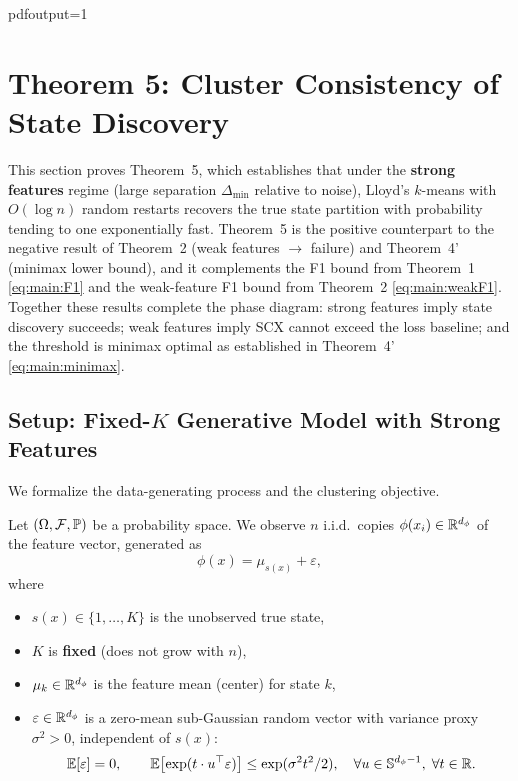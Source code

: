pdfoutput=1
\section{Theorem 5: Cluster Consistency of State Discovery}
\label{sec:S5}

This section proves Theorem~5, which establishes that under the
\textbf{strong features} regime (large separation $\Delta_{\min}$ relative
to noise), Lloyd's $k$-means with $O(\log n)$ random restarts recovers
the true state partition with probability tending to one exponentially fast.
Theorem~5 is the positive counterpart to the negative result of Theorem~2
(weak features $\to$ failure) and Theorem~4' (minimax lower bound), and
it complements the F1 bound from Theorem~1 \eqref{eq:main:F1} and the
weak-feature F1 bound from Theorem~2 \eqref{eq:main:weakF1}.
Together these results complete the phase diagram: strong features imply
state discovery succeeds; weak features imply SCX cannot exceed the loss
baseline; and the threshold is minimax optimal as established in
Theorem~4' \eqref{eq:main:minimax}.

\subsection{Setup: Fixed-$K$ Generative Model with Strong Features}
\label{sec:S5:setup}

We formalize the data-generating process and the clustering objective.

\begin{assumption}
\label{ass:S5:gen}
Let $(\Omega,\mathcal{F},\mathbb{P})$ be a probability space. We observe $n$ i.i.d.\ copies
$\phi(x_i)\in\mathbb{R}^{d_\phi}$ of the feature vector, generated as
\begin{equation}
\phi(x) = \mu_{s(x)} + \varepsilon,
\label{eq:S5:gen}
\end{equation}
where
\begin{itemize}
\item $s(x)\in\{1,\dots,K\}$ is the unobserved true state,
\item $K$ is \textbf{fixed} (does not grow with $n$),
\item $\mu_k\in\mathbb{R}^{d_\phi}$ is the feature mean (center) for state $k$,
\item $\varepsilon\in\mathbb{R}^{d_\phi}$ is a zero-mean sub-Gaussian random vector
      with variance proxy $\sigma^2>0$, independent of $s(x)$:
      \[
      \mathbb{E}[\varepsilon]=0,\qquad
      \mathbb{E}\bigl[\exp(t\cdot u^\top\varepsilon)\bigr]\le\exp(\sigma^2 t^2/2),\quad
      \forall u\in\mathbb{S}^{d_\phi-1},\;\forall t\in\mathbb{R}.
      \]
\end{itemize}
\end{assumption}

